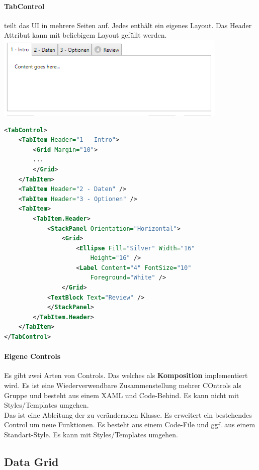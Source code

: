 \paragraph{TabControl} teilt das UI in mehrere Seiten auf. Jedes  enthält ein eigenes Layout. Das Header Attribut kann mit beliebigem Layout gefüllt werden.
\includegraphics[scale=0.3]{img/tabcontrol.png}
\begin{lstlisting}[language=xml]
<TabControl>
    <TabItem Header="1 - Intro">
        <Grid Margin="10">
        ...
        </Grid>
    </TabItem>
    <TabItem Header="2 - Daten" />
    <TabItem Header="3 - Optionen" />
    <TabItem>
        <TabItem.Header>
            <StackPanel Orientation="Horizontal">
                <Grid>
                    <Ellipse Fill="Silver" Width="16"
                        Height="16" />
                    <Label Content="4" FontSize="10"
                        Foreground="White" />
                </Grid>
            <TextBlock Text="Review" />
            </StackPanel>
        </TabItem.Header>
    </TabItem>
</TabControl>
\end{lstlisting}
\paragraph{Eigene Controls} Es gibt zwei Arten von Controls. Das  welches als \textbf{Komposition} implementiert wird. Es ist eine Wiederverwendbare Zusammenstellung mehrer COntrols als Gruppe und besteht aus einem XAML und Code-Behind. Es kann nicht mit Styles/Templates umgehen.\\
Das  ist eine Ableitung der zu verändernden Klasse. Es erweitert ein bestehendes Control um neue Funktionen. Es besteht aus einem Code-File und ggf. aus einem Standart-Style. Es kann mit Styles/Templates umgehen.



\subsection{Data Grid}

